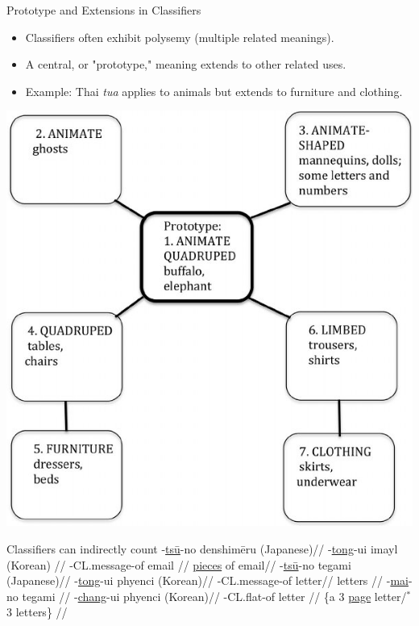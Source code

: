 \documentclass{beamer}
\newcommand{\cll}[1]{\uline{#1}}
\begin{document}
\begin{frame}{Prototype and Extensions in Classifiers}
\begin{itemize}
    \item Classifiers often exhibit polysemy (multiple related meanings).
    \item A central, or "prototype," meaning extends to other related uses.
    \item Example: Thai \textit{tua} applies to animals but extends to furniture and clothing.
\end{itemize}
 \begin{center}
\noindent\includegraphics[height=0.6\textheight]{pics/Radial-category-structure-for-Thai-classifier-tua-Source-Adapted-from-Deepadung_W640.jpg}
 \end{center}
\end{frame}
\begin{frame}{Classifiers can indirectly count}
  \ex
  \begingl
  -\cll{ts\=u}-no denshim\=eru (Japanese)//
  -\cll{tong}-ui imayl (Korean) //
  -CL.message-of email //
   \cll{pieces} of email//
  \endgl
  \xe
  \ex
  \begingl
  -\cll{ts\=u}-no tegami (Japanese)//
  -\cll{tong}-ui phyenci (Korean)//
  -CL.message-of letter//
  letters           //%
  \endgl
\xe
\ex
  \begingl
{}-\cll{mai}-no tegami //
-\cll{chang}-ui phyenci (Korean)//
-CL.flat-of letter //
\glft \{a 3 \cll{page} letter/$^*$3 letters\}  //%
  \endgl
  \xe

\end{frame}
\end{document}
